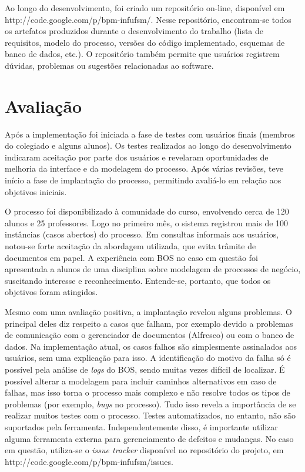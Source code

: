 \documentclass[12pt]{article}
\begin{document}
Ao longo do desenvolvimento, foi criado um repositório on-line, disponível em http://code.google.com/p/bpm-infufsm/. Nesse repositório, encontram-se todos os artefatos produzidos durante o desenvolvimento do trabalho (lista de requisitos, modelo do processo, versões do código implementado, esquemas de banco de dados, etc.). O repositório também permite que usuários registrem dúvidas, problemas ou sugestões relacionadas ao software.


\section{Avaliação}

Após a implementação foi iniciada a fase de testes com usuários finais (membros do colegiado e alguns alunos). Os testes realizados ao longo do desenvolvimento indicaram aceitação por parte dos usuários e revelaram oportunidades de melhoria da interface e da modelagem do processo. Após várias revisões, teve início a fase de implantação do processo, permitindo avaliá-lo em relação aos objetivos iniciais.

O processo foi disponibilizado à comunidade do curso, envolvendo cerca de 120 alunos e 25 professores. Logo no primeiro mês, o sistema registrou mais de 100 instâncias (casos abertos) do processo. Em consultas informais aos usuários, notou-se forte aceitação da abordagem utilizada, que evita trâmite de documentos em papel. A experiência com BOS no caso em questão foi apresentada a alunos de uma disciplina sobre modelagem de processos de negócio, suscitando interesse e reconhecimento. Entende-se, portanto, que todos os objetivos foram atingidos.

Mesmo com uma avaliação positiva, a implantação revelou alguns problemas. O principal deles diz respeito a casos que falham, por exemplo devido a problemas de comunicação com o gerenciador de documentos (Alfresco) ou com o banco de dados. Na implementação atual, os casos falhos são simplesmente assinalados aos usuários, sem uma explicação para isso. A identificação do motivo da falha só é possível pela análise de \emph{logs} do BOS, sendo muitas vezes difícil de localizar. É possível alterar a modelagem para incluir caminhos alternativos em caso de falhas, mas isso torna o processo mais complexo e não resolve todos os tipos de problemas (por exemplo, \emph{bugs} no processo). Tudo isso revela a importância de se realizar muitos testes com o processo. Testes automatizados, no entanto, não são suportados pela ferramenta. Independentemente disso, é importante utilizar alguma ferramenta externa para gerenciamento de defeitos e mudanças. No caso em questão, utiliza-se o \emph{issue tracker} disponível no repositório do projeto, em http://code.google.com/p/bpm-infufsm/issues.
\end{document}
